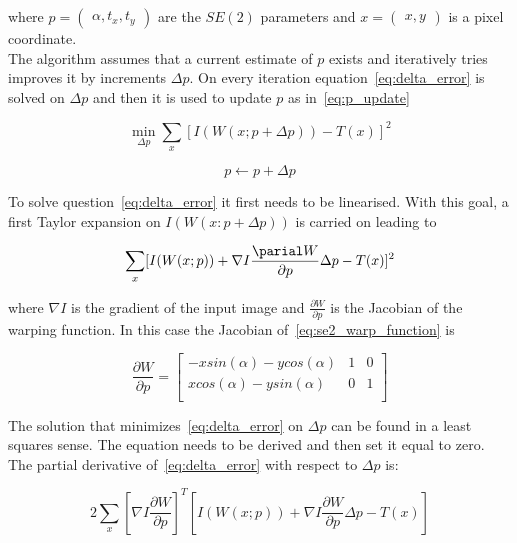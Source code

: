 where $p = \begin{pmatrix} \alpha , t_x , t_y \end{pmatrix}$ are the $SE(2)$ parameters and $x = \begin{pmatrix} x , y \end{pmatrix}$ is a pixel coordinate.\\

  The algorithm assumes that a current estimate of $p$ exists and iteratively tries improves it by increments $\Delta p$. On every  iteration equation~\ref{eq:delta_error} is solved on $\Delta p$ and then it is used to update $p$ as in~\ref{eq:p_update}

\begin{equation}
  \min_{\Delta p}  \sum_x [I(W(x;p + \Delta p)) - T(x)]^2
  \label{eq:delta_error}
\end{equation}

\begin{equation}
  p \leftarrow p + \Delta p
  \label{eq:p_update}
\end{equation}

To solve question~\ref{eq:delta_error}  it first needs to be linearised. With this goal, a first Taylor expansion on $I(W(x:p + \Delta p))$ is carried on leading to

\begin{equation}
\sum_x [I(W(x;p)) + \nabla I \frac{\parial W}{\partial p} \Delta p - T(x)]^2
\end{equation}

where $\nabla I$ is the gradient of the input image and $\frac{\partial W}{\partial p}$ is the Jacobian of the warping function. In this case the Jacobian of~\ref{eq:se2_warp_function} is

\begin{equation}
  \frac{\partial W}{\partial p}
  =
  \begin{bmatrix}
    -xsin(\alpha) - ycos(\alpha) & 1 & 0 \\
    xcos(\alpha) - ysin(\alpha) & 0 & 1 \\
  \end{bmatrix}
  \label{eq:se2_jac}
\end{equation}


The solution that minimizes~\ref{eq:delta_error}  on $\Delta p$ can be found in a least squares sense. The equation needs to be derived and then set it equal to zero. The partial derivative of~\ref{eq:delta_error} with respect to $\Delta p$ is:

\begin{equation}
  2 \sum_x \left[\nabla I \frac{\partial W}{\partial p}\right]^T \left[I(W(x;p)) + \nabla I \frac{\partial W}{\partial p} \Delta p - T(x) \right]
  \label{eq:derivated}
\end{equation}

